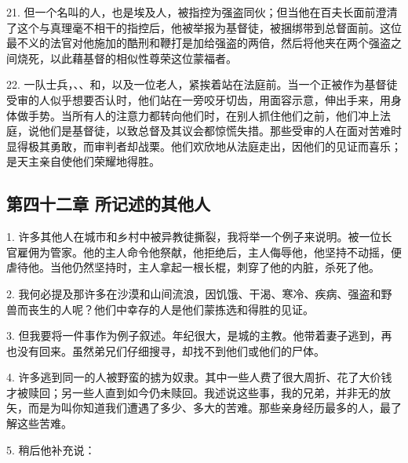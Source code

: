 21. 但一个名叫的人，也是埃及人，被指控为强盗同伙；但当他在百夫长面前澄清了这个与真理毫不相干的指控后，他被举报为基督徒，被捆绑带到总督面前。这位最不义的法官对他施加的酷刑和鞭打是加给强盗的两倍，然后将他夹在两个强盗之间烧死，以此藉基督的相似性尊荣这位蒙福者。\par

22. 一队士兵，、、和，以及一位老人，紧挨着站在法庭前。当一个正被作为基督徒受审的人似乎想要否认时，他们站在一旁咬牙切齿，用面容示意，伸出手来，用身体做手势。当所有人的注意力都转向他们时，在别人抓住他们之前，他们冲上法庭，说他们是基督徒，以致总督及其议会都惊慌失措。那些受审的人在面对苦难时显得极其勇敢，而审判者却战栗。他们欢欣地从法庭走出，因他们的见证而喜乐；是天主亲自使他们荣耀地得胜。\par


\subsection{第四十二章 所记述的其他人}

1. 许多其他人在城市和乡村中被异教徒撕裂，我将举一个例子来说明。被一位长官雇佣为管家。他的主人命令他祭献，他拒绝后，主人侮辱他，他坚持不动摇，便虐待他。当他仍然坚持时，主人拿起一根长棍，刺穿了他的内脏，杀死了他。\par

2. 我何必提及那许多在沙漠和山间流浪，因饥饿、干渴、寒冷、疾病、强盗和野兽而丧生的人呢？他们中幸存的人是他们蒙拣选和得胜的见证。\par

3. 但我要将一件事作为例子叙述。年纪很大，是城的主教。他带着妻子逃到，再也没有回来。虽然弟兄们仔细搜寻，却找不到他们或他们的尸体。\par

4. 许多逃到同一的人被野蛮的掳为奴隶。其中一些人费了很大周折、花了大价钱才被赎回；另一些人直到如今仍未赎回。我述说这些事，我的兄弟，并非无的放矢，而是为叫你知道我们遭遇了多少、多大的苦难。那些亲身经历最多的人，最了解这些苦难。\par

5. 稍后他补充说：\par

